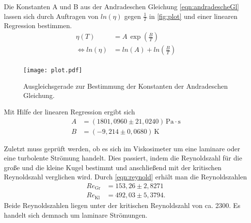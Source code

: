 Die Konstanten A und B aus der Andradeschen Gleichung \ref{eqn:andradescheGl} lassen sich durch Auftragen von $ln(\eta)$ gegen $\frac{1}{T}$ in \autoref{fig:plot} und einer
linearen Regression bestimmen.
\begin{align*}
  \eta(T) &= A \, \exp{\left(\frac{B}{T}\right)} \\
  \iff ln(\eta) &= ln(A) + ln(\frac{B}{T}) \\
\end{align*}

\begin{figure}[H]
  \centering
  \texttt{[image: plot.pdf]}
  \caption{Ausgleichsgerade zur Bestimmung der Konstanten der Andradeschen Gleichung.}
  \label{fig:plot}
\end{figure}

Mit Hilfe der linearen Regression ergibt sich
\begin{align*}
  A &= (1801,0960\pm 21,0240) \,\si{\pascal}\cdot\si{\second}\\
  B &= (-9,214\pm 0,0680) \,\si{\kelvin}
\end{align*}

Zuletzt muss geprüft werden, ob es sich im Viskosimeter um eine laminare oder eine turbolente Strömung handelt. Dies passiert, indem die Reynoldszahl für die große und die
kleine Kugel bestimmt und anschließend mit der kritischen Reynoldszahl verglichen wird. Durch \autoref{eqn:reynold} erhält man die Reynoldszahlen
\begin{align*}
  Re_{\text{Gr}} &= 153,26\pm 2,8271\\
  Re_{\text{Kl}} &= 492,03\pm 5,3794.
\end{align*}
Beide Reynoldszahlen liegen unter der kritischen Reynoldszahl von ca. 2300. Es handelt sich demnach um laminare Strömungen.
